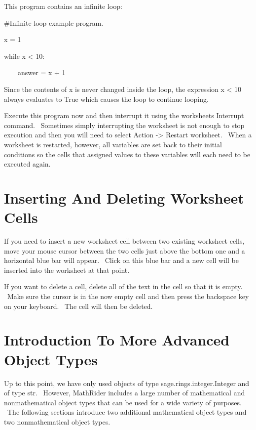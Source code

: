 \documentclass[12pt,twoside]{book}
\begin{document}
\bigskip

This program contains an infinite loop:


\bigskip

\#Infinite loop example program.


\bigskip

x = 1

while x {\textless} 10:

\ \ \ \ answer = x + 1

{\textbar}


\bigskip

Since the contents of x is never changed inside the loop, the expression
x {\textless} 10 always evaluates to True which causes the loop to
continue looping.


\bigskip

Execute this program now and then interrupt it using the
worksheet{\textquotesingle}s Interrupt command. \ Sometimes simply
interrupting the worksheet is not enough to stop execution and then you
will need to select Action {}-{\textgreater} Restart worksheet. \ When
a worksheet is restarted, however, all variables are set back to their
initial conditions so the cells that assigned values to these variables
will each need to be executed again. 

\section[Inserting And Deleting Worksheet Cells]{Inserting And Deleting Worksheet Cells}
If you need to insert a new worksheet cell between two existing
worksheet cells, move your mouse cursor between the two cells just
above the bottom one and a horizontal blue bar will appear. \ Click on
this blue bar and a new cell will be inserted into the worksheet at
that point.


\bigskip

If you want to delete a cell, delete all of the text in the cell so that
it is empty. \ Make sure the cursor is in the now empty cell and then
press the backspace key on your keyboard. \ The cell will then be
deleted.

\section[Introduction To More Advanced Object Types]{Introduction To More Advanced Object Types}
Up to this point, we have only used objects of type
{\textquotesingle}sage.rings.integer.Integer{\textquotesingle} and of
type {\textquotesingle}str{\textquotesingle}. \ However, MathRider
includes a large number of mathematical and nonmathematical object
types that can be used for a wide variety of purposes. \ The following
sections introduce two additional mathematical object types and two
nonmathematical object types. 
\end{document}
